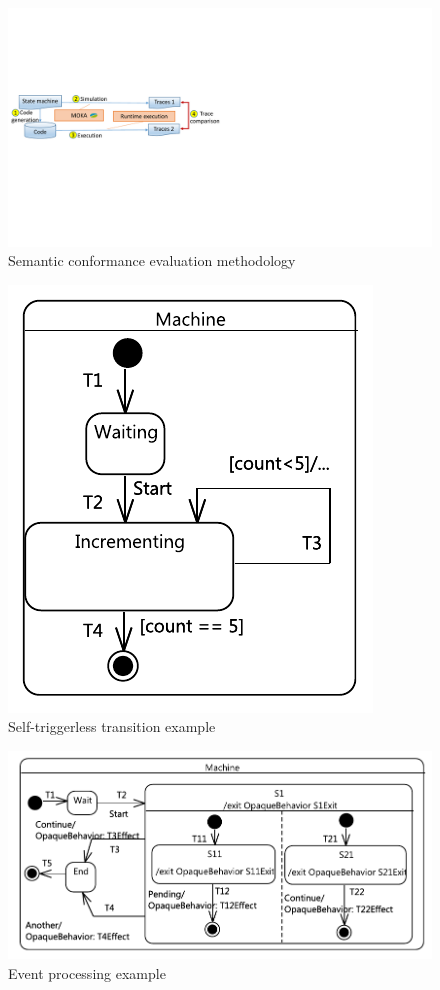 \begin{figure}
\centering
\includegraphics[clip, trim=0.8cm 8.1cm 19.4cm 6.9cm, width=\columnwidth]{figures/semanticconformance.pdf}
\caption{Semantic conformance evaluation methodology} 
\label{fig:semanticconformance}
\end{figure}

\begin{figure}
\centering
\includegraphics[clip, trim=0.25cm 0.25cm 0.25cm 0.25cm, width=0.3\columnwidth]{figures/autotransition}
\caption{Self-triggerless transition example} 
\label{fig:autotransition}
\end{figure}

\begin{figure}
\centering
\includegraphics[clip, trim=0.25cm 0.25cm 0.25cm 0.25cm, width=0.9\columnwidth]{figures/Deferred004}
\caption{Event processing example} 
\label{fig:Deferred}
\end{figure}

